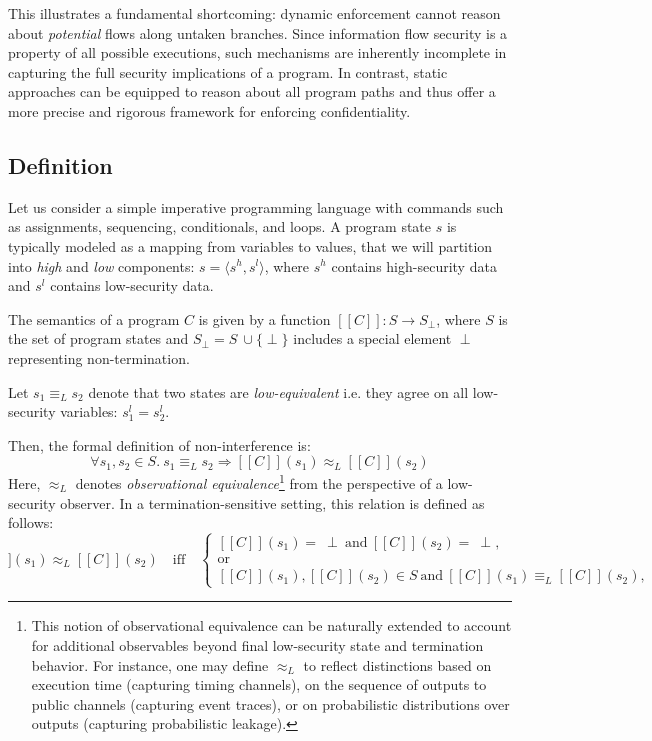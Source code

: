 \documentclass[12pt,a4paper,twoside]{book}
\newcommand{\llbracket}{[\![}
\newcommand{\rrbracket}{]\!]}
\begin{document}
This illustrates a fundamental shortcoming: dynamic enforcement cannot reason about \textit{potential} flows along untaken branches. Since information flow security is a property of all possible executions\cite{sabelfeld2003language}\cite{denning1976lattice}, such mechanisms are inherently incomplete in capturing the full security implications of a program.
In contrast, static approaches can be equipped to reason about all program paths\cite{volpano1996sound} and thus offer a more precise and rigorous framework for enforcing confidentiality.

\subsection{Definition}
Let us consider a simple imperative programming language\cite{winskel1993formal} with commands such as assignments, sequencing, conditionals, and loops. A program state $s$ is typically modeled as a mapping from variables to values\cite{winskel1993formal}, that we will partition into \emph{high} and \emph{low} components: $s = \langle s^h, s^l \rangle$, where $s^h$ contains high-security data and $s^l$ contains low-security data.

The semantics of a program $C$ is given\cite{kahn1987natural}\cite{nielson1992semantics} by a function $\llbracket C \rrbracket : S \rightarrow S_\perp$, where $S$ is the set of program states and $S_\perp = S\ \cup \{ \perp \}$ includes a special element $\perp$ representing non-termination.

Let $s_1 \equiv_L s_2$ denote that two states are \emph{low-equivalent} i.e. they agree on all low-security variables: $s_1^l = s_2^l$.

Then, the formal definition of non-interference is\cite{volpano1996sound}\cite{goguen1982security}:
\[
  \forall s_1, s_2 \in S.\ s_1 \equiv_L s_2 \Rightarrow \llbracket C \rrbracket(s_1) \approx_L \llbracket C \rrbracket(s_2)
\]
Here, \(\approx_L\) denotes \emph{observational equivalence}\footnote{This notion of observational equivalence can be naturally extended to account for additional observables beyond final low-security state and termination behavior\cite{sabelfeld2003language}. For instance, one may define \(\approx_L\) to reflect distinctions based on execution time (capturing timing channels), on the sequence of outputs to public channels (capturing event traces), or on probabilistic distributions over outputs (capturing probabilistic leakage).} from the perspective of a low-security observer. In a termination-sensitive setting\cite{hedin2012perspective}, this relation is defined as follows:
\begin{equation}
\llbracket C \rrbracket(s_1) \approx_L \llbracket C \rrbracket(s_2)
\quad\text{iff}\quad
\begin{cases}
\llbracket C \rrbracket(s_1) =\ \perp \ \text{and}\ \llbracket C \rrbracket(s_2) =\ \perp, \\
\text{or} \\
\llbracket C \rrbracket(s_1), \llbracket C \rrbracket(s_2) \in S \ \text{and}\
\llbracket C \rrbracket(s_1) \equiv_L \llbracket C \rrbracket(s_2),
\end{cases}
\label{eq:approx_tsni}
\end{equation}
\end{document}
